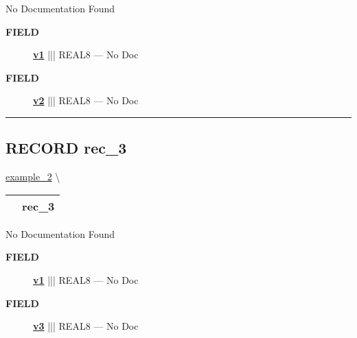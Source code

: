 \par





No Documentation Found







\par
\begin{description}
\item [\colorbox{tagtype}{\color{white} \textbf{\textsf{FIELD}}}] \textbf{\underline{v1}} ||| REAL8 --- No Doc
\item [\colorbox{tagtype}{\color{white} \textbf{\textsf{FIELD}}}] \textbf{\underline{v2}} ||| REAL8 --- No Doc
\end{description}





\rule{\linewidth}{0.5pt}
\subsection*{\textsf{\colorbox{headtoc}{\color{white} RECORD}
rec\_3}}

\hypertarget{ecldoc:intest.inintest.example_2.rec_3}{}
\hspace{0pt} \hyperlink{ecldoc:intest.inintest.example_2}{example_2} \textbackslash 

{\renewcommand{\arraystretch}{1.5}
\begin{tabularx}{\textwidth}{|>{\raggedright\arraybackslash}l|X|}
\hline
\hspace{0pt}\mytexttt{\color{red} } & \textbf{rec\_3} \\
\hline
\end{tabularx}
}

\par





No Documentation Found







\par
\begin{description}
\item [\colorbox{tagtype}{\color{white} \textbf{\textsf{FIELD}}}] \textbf{\underline{v1}} ||| REAL8 --- No Doc
\item [\colorbox{tagtype}{\color{white} \textbf{\textsf{FIELD}}}] \textbf{\underline{v3}} ||| REAL8 --- No Doc
\end{description}





